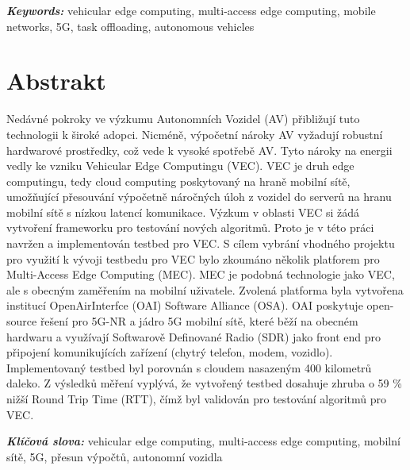 \documentclass[12pt,a4paper,twoside]{report}
\providecommand{\keywords}[1]{\vspace{4pt}\textbf{\textit{Keywords: }} #1}
\providecommand{\keywordscz}[1]{\vspace{4pt}\textbf{\textit{Klíčová slova: }} #1}
\begin{document}
\keywords{vehicular edge computing, multi-access edge computing, mobile networks, 5G, task offloading, autonomous vehicles}
%
%
\newpage

\chapter*{Abstrakt}
Nedávné pokroky ve výzkumu Autonomních Vozidel (AV) přibližují tuto technologii k široké adopci. Nicméně, výpočetní nároky AV vyžadují robustní hardwarové prostředky, což vede k vysoké spotřebě AV. Tyto nároky na energii vedly ke vzniku Vehicular Edge Computingu (VEC). VEC je druh edge computingu, tedy cloud computing poskytovaný na hraně mobilní sítě, umožňující přesouvání výpočetně náročných úloh z vozidel do serverů na hranu mobilní sítě s nízkou latencí komunikace. Výzkum v oblasti VEC si žádá vytvoření frameworku pro testování nových algoritmů. Proto je v této práci navržen a implementován testbed pro VEC. S cílem vybrání vhodného projektu pro využití k vývoji testbedu pro VEC bylo zkoumáno několik platforem pro Multi-Access Edge Computing (MEC). MEC je podobná technologie jako VEC, ale s obecným zaměřením na mobilní uživatele. Zvolená platforma byla vytvořena institucí OpenAirInterfce (OAI) Software Alliance (OSA). OAI poskytuje open-source řešení pro 5G-NR a jádro 5G mobilní sítě, které běží na obecném hardwaru a využívají Softwarově Definované Radio (SDR) jako front end pro připojení komunikujících zařízení (chytrý telefon, modem, vozidlo). Implementovaný testbed byl porovnán s cloudem nasazeným 400 kilometrů daleko. Z výsledků měření vyplývá, že vytvořený testbed dosahuje zhruba o 59 \% nižší Round Trip Time (RTT), čímž byl validován pro testování algoritmů pro VEC.

\keywordscz{vehicular edge computing, multi-access edge computing, mobilní sítě, 5G, přesun výpočtů, autonomn\'i vozidla}
%
%
\newpage

\tableofcontents			

\glsaddallunused
\printglossary[type=\acronymtype,title={List of Abbreviations}]	%



\newpage
\end{document}
